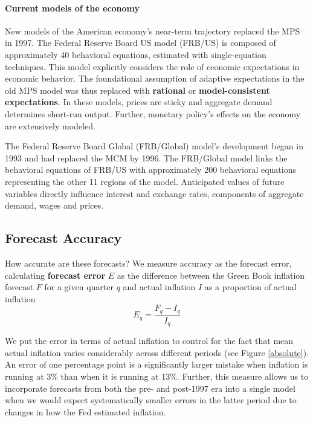\documentclass[a4paper]{article}\usepackage{graphicx, color}
\begin{document}
\paragraph{Current models of the economy}
New models of the American economy's near-term trajectory replaced the MPS in 1997. The Federal Reserve Board US model (FRB/US) is composed of approximately 40 behavioral equations, estimated with single-equation techniques. This model explicitly considers the role of economic expectations in economic behavior. The foundational assumption of adaptive expectations in the old MPS model was thus replaced with {\bf{rational}} or {\bf{model-consistent expectations}}. In these models, prices are sticky and aggregate demand determines short-run output. Further, monetary policy's effects on the economy are extensively modeled. 

The Federal Reserve Board Global (FRB/Global) model's development began in 1993 and had replaced the MCM by 1996. The FRB/Global model links the behavioral equations of FRB/US with approximately 200 behavioral equations representing the other 11 regions of the model. Anticipated values of future variables directly influence interest and exchange rates, components of aggregate demand, wages and prices.

\subsection{Forecast Accuracy}\label{ForecastAcc}

How accurate are these forecasts? We measure accuracy as the forecast error,  calculating {\bf{forecast error}} $E$ as the difference between the Green Book inflation forecast $F$ for a given quarter $q$ and actual inflation $I$ as a proportion of actual inflation
%
\begin{equation}
    E_{q} = \frac{F_{q} - I_{q}}{I_{q}}
\end{equation}
%

We put the error in terms of actual inflation to control for the fact that mean actual inflation varies considerably across different periods (see Figure \ref{absolute}). An error of one percentage point is a significantly larger mistake when inflation is running at 3\% than when it is running at 13\%. Further, this measure allows us to incorporate forecasts from both the pre- and post-1997 era into a single model when we would expect systematically smaller errors in the latter period due to changes in how the Fed estimated inflation. 
\end{document}
